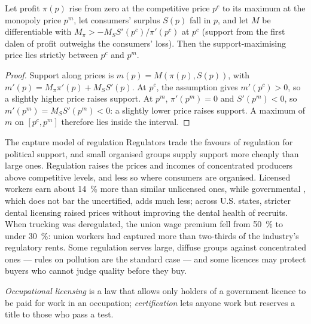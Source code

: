 \begin{proposition}\label{prop:b3:interest-groups-and-regulation:peltzman}
Let profit $\pi(p)$ rise from zero at the competitive price $p^c$ to its maximum at the monopoly
price $p^m$, let consumers' surplus $S(p)$ fall in $p$, and let $M$ be differentiable with
$M_\pi > -M_S S'(p^c)/\pi'(p^c)$ at $p^c$ (support from the first dalen of profit outweighs the consumers'
loss). Then the support-maximising price lies strictly between $p^c$ and $p^m$.
\end{proposition}

\begin{proof}
Support along prices is $m(p) = M(\pi(p), S(p))$, with $m'(p) = M_\pi\pi'(p) + M_SS'(p)$. At $p^c$, the
assumption gives $m'(p^c) > 0$, so a slightly higher price raises support. At $p^m$, $\pi'(p^m) = 0$ and
$S'(p^m) < 0$, so $m'(p^m) = M_SS'(p^m) < 0$: a slightly lower price raises support. A maximum of
$m$ on $[p^c, p^m]$ therefore lies inside the interval.
\end{proof}

\begin{model}{The capture model of regulation}
\assumes Regulators trade the favours of regulation for political support, and
small organised groups supply support more cheaply than large ones.
\predicts Regulation raises the prices and incomes of concentrated producers above
competitive levels, and less so where consumers are organised.
\tested Licensed workers earn about 14~\% more than similar unlicensed ones, while
governmental , which does not bar the uncertified, adds much less; %
across U.S. states, stricter dental licensing raised prices without improving the
dental health of recruits. %
When trucking was deregulated, the union wage premium fell from 50~\% to under 30~\%:
union workers had captured more than two-thirds of the industry's regulatory
rents. %
\breaks Some regulation serves large, diffuse groups against concentrated ones ---
rules on pollution are the standard case --- and some licences may protect buyers
who cannot judge quality before they buy.
\end{model}

\begin{definition}\label{def:b3:interest-groups-and-regulation:licensing}
\emph{Occupational licensing} is a law that allows only holders of a government
licence to be paid for work in an occupation; \emph{certification} lets anyone work
but reserves a title to those who pass a test.
\end{definition}

